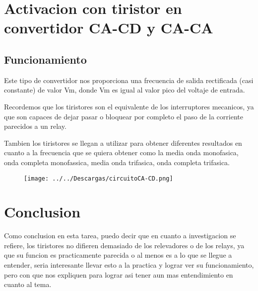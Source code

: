 \documentclass[12pt,a4paper]{article}
\begin{document}
\section{Activacion con tiristor en convertidor CA-CD y CA-CA}
\subsection{Funcionamiento}
Este tipo de convertidor nos proporciona una frecuencia de salida rectificada (casi constante) de valor Vm, donde Vm es igual al valor pico del voltaje de entrada.

Recordemos que los tiristores son el equivalente de los interruptores mecanicos, ya que son capaces de dejar pasar o bloquear por completo el paso de la corriente parecidos a un relay.

Tambien los tiristores se llegan a utilizar para obtener diferentes resultados en cuanto a la frecuencia que se quiera obtener como la media onda monofasica, onda completa monofassica, media onda trifasica, onda completa trifasica.

\begin{figure}[h!]
\centering
\texttt{[image: ../../Descargas/circuitoCA-CD.png]} 
\end{figure}

\section*{Conclusion}
Como conclusion en esta tarea, puedo decir que en cuanto a investigacion se refiere, los tiristores no difieren demasiado de los relevadores o de los relays, ya que su funcion es practicamente parecida o al menos es a lo que se llegue a entender, seria interesante llevar esto a la practica y lograr ver su funcionamiento, pero con que nos expliquen para lograr asi tener aun mas entendimiento en cuanto al tema.
\end{document}
